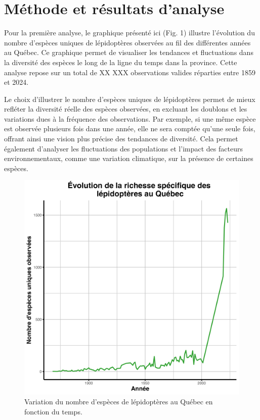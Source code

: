 \documentclass[9pt,twocolumn,twoside,]{pnas-new}
\begin{document}
\section{Méthode et résultats
d'analyse}\label{muxe9thode-et-ruxe9sultats-danalyse}

Pour la première analyse, le graphique présenté ici (Fig. 1) illustre
l'évolution du nombre d'espèces uniques de lépidoptères observées au fil
des différentes années au Québec. Ce graphique permet de visualiser les
tendances et fluctuations dans la diversité des espèces le long de la
ligne du temps dans la province. Cette analyse repose sur un total de XX
XXX observations valides réparties entre 1859 et 2024.

Le choix d'illustrer le nombre d'espèces uniques de lépidoptères permet
de mieux refléter la diversité réelle des espèces observées, en excluant
les doublons et les variations dues à la fréquence des observations. Par
exemple, si une même espèce est observée plusieurs fois dans une année,
elle ne sera comptée qu'une seule fois, offrant ainsi une vision plus
précise des tendances de diversité. Cela permet également d'analyser les
fluctuations des populations et l'impact des facteurs environnementaux,
comme une variation climatique, sur la présence de certaines espèces.

\begin{figure}
\includegraphics[width=0.9\linewidth]{../Figures_analyse/graphique_biodiversite} \caption{Variation du nombre d'espèces de lépidoptères au Québec en fonction du temps.}\label{fig:fig_graphique_biodiversite}
\end{figure}
\end{document}
